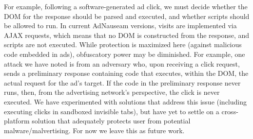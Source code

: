 \documentclass[conference]{IEEEtran}
\begin{document}
For example, following a software-generated ad click, we must decide whether the DOM for the response should be parsed and executed, and whether scripts should be allowed to run. In current AdNauseam versions, visits are implemented via AJAX requests, which means that no DOM is constructed from the response, and scripts are not executed. While protection is maximized here (against malicious code embedded in ads), obfuscatory power may be diminished. For example, one attack we have noted is from an adversary who, upon receiving a click request, sends a preliminary response containing code that executes, within the DOM, the actual request for the ad's target. If the code in the preliminary response never runs, then, from the advertising network's perspective, the click is never executed. We have experimented with solutions that address this issue (including executing clicks in sandboxed invisible tabs), but have yet to settle on a cross-platform solution that adequately protects user from potential malware/malvertising. For now we leave this as future work.


\end{document}
